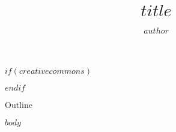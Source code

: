 \documentclass[$fontsize$, aspectratio=169]{beamer}
\author{$author$}
\title{$title$}
\begin{document}
\begin{frame}
  \titlepage
\end{frame}

$if(creativecommons)$
\begin{frame}
  \doclicenseThis
\end{frame}
$endif$

\begin{frame}{Outline}
\tableofcontents
\end{frame}

$body$
\end{document}
